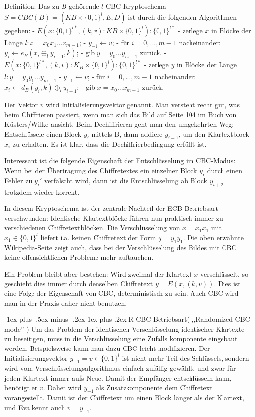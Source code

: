 \documentclass[a4paper]{article}
\makeatletter
\renewcommand{\subsubsection}{\@startsection{subsubsection}{3}{0mm}%
 {-1ex plus -.5ex minus -.2ex}%
 {1ex plus .2ex}%
 {\normalfont\small\bfseries}}
\makeatother
\begin{document}
\begin{multicols}{3}
    Definition: Das zu $B$ gehörende $l$-CBC-Kryptoschema $S=CBC(B)=(KB\times\{0,1\}^l,E,D)$ ist durch die folgenden Algorithmen gegeben:
    - $E(x:\{0,1\}^{l*},(k,v) :KB\times\{0,1\}^l) :\{0,1\}^{l*}$
    - zerlege $x$ in Blöcke der Länge $l:x=x_0 x_1 ...x_{m-1}$;
    - $y_{-1} \leftarrow v$;
    - für $i= 0,...,m-1$ nacheinander: $y_i\leftarrow e_B(x_i\oplus_l y_{i-1},k)$;
    - gib $y=y_0 ...y_{m-1}$ zurück.
    - $E(x:\{0,1\}^{l*},(k,v) :K_B\times\{0,1\}^l) :\{0,1\}^{l*}$
    - zerlege $y$ in Blöcke der Länge $l:y=y_0 y_1 ...y_{m-1}$
    - $y_{-1} \leftarrow v$;
    - für $i=0,...,m-1$ nacheinander: $x_i\leftarrow d_B(y_i,k)\oplus_l y_{i-1}$;
    - gib $x=x_0 ...x_{m-1}$ zurück.

    Der Vektor $v$ wird Initialisierungsvektor genannt. Man versteht recht gut, was beim Chiffrieren passiert, wenn man sich das Bild auf Seite 104 im Buch von Küsters/Wilke ansieht. Beim Dechiffrieren geht man den umgekehrten Weg: Entschlüssele einen Block $y_i$ mittels B, dann addiere $y_{i-1}$, um den Klartextblock $x_i$ zu erhalten. Es ist klar, dass die Dechiffrierbedingung erfüllt ist.

    Interessant ist die folgende Eigenschaft der Entschlüsselung im CBC-Modus: Wenn bei der Übertragung des Chiffretextes ein einzelner Block $y_i$ durch einen Fehler zu $y_i'$ verfälscht wird, dann ist die Entschlüsselung ab Block $y_{i+2}$ trotzdem wieder korrekt.

    In diesem Kryptoschema ist der zentrale Nachteil der ECB-Betriebsart verschwunden: Identische Klartextblöcke führen nun praktisch immer zu verschiedenen Chiffretextblöcken. Die Verschlüsselung von $x=x_1 x_1$ mit $x_1\in\{0,1\}^l$ liefert i.a. keinen Chiffretext der Form $y=y_1 y_1$. Die oben erwähnte Wikipedia-Seite zeigt auch, dass bei der Verschlüsselung des Bildes mit CBC keine offensichtlichen Probleme mehr auftauchen.

    Ein Problem bleibt aber bestehen: Wird zweimal der Klartext $x$ verschlüsselt, so geschieht dies immer durch denselben Chiffretext $y=E(x,(k,v))$. Dies ist eine Folge der Eigenschaft von CBC, deterministisch zu sein. Auch CBC wird man in der Praxis daher nicht benutzen.

    \subsubsection{R-CBC-Betriebsart( ,,Randomized CBC mode'' )}
    Um das Problem der identischen Verschlüsselung identischer Klartexte zu beseitigen, muss in die Verschlüsselung eine Zufalls komponente eingebaut werden. Beispielsweise kann man dazu CBC leicht modifizieren. Der Initialisierungsvektor $y_{-1}=v\in\{0,1\}^l$  ist nicht mehr Teil des Schlüssels, sondern wird vom Verschlüsselungsalgorithmus einfach zufällig gewählt, und zwar für jeden Klartext immer aufs Neue. Damit der Empfänger entschlüsseln kann, benötigt er $v$. Daher wird $y_{-1}$ als Zusatzkomponente dem Chiffretext vorangestellt. Damit ist der Chiffretext um einen Block länger als der Klartext, und Eva kennt auch $v=y_{-1}$.


\end{multicols}
\end{document}

